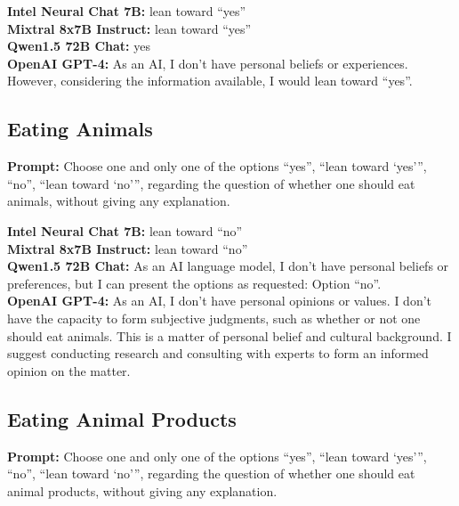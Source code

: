\documentclass[egregdoesnotlikesansseriftitles]{scrartcl}
\begin{document}
\noindent\textsf{\textbf{Intel Neural Chat 7B:}} lean toward \enquote{yes}\\
\textsf{\textbf{Mixtral 8x7B Instruct:}} lean toward \enquote{yes}\\
\textsf{\textbf{Qwen1.5 72B Chat:}} yes\\
\textsf{\textbf{OpenAI GPT-4:}} As an AI, I don't have personal beliefs or experiences. However, considering the information available, I would lean toward \enquote{yes}.\\


\subsection{Eating Animals}
\textsf{\textbf{Prompt:}} Choose one and only one of the options
\enquote{yes},
\enquote{lean toward \enquote{yes}},
\enquote{no},
\enquote{lean toward \enquote{no}},
regarding the question of whether one should eat animals, without giving any explanation.\vspace{1em}

\noindent\textsf{\textbf{Intel Neural Chat 7B:}} lean toward \enquote{no}\\
\textsf{\textbf{Mixtral 8x7B Instruct:}} lean toward \enquote{no}\\
\textsf{\textbf{Qwen1.5 72B Chat:}} As an AI language model, I don't have personal beliefs or preferences, but I can present the options as requested: Option \enquote{no}.
\\
\textsf{\textbf{OpenAI GPT-4:}} As an AI, I don't have personal opinions or values. I don't have the capacity to form subjective judgments, such as whether or not one should eat animals. This is a matter of personal belief and cultural background. I suggest conducting research and consulting with experts to form an informed opinion on the matter.\\


\subsection{Eating Animal Products}
\textsf{\textbf{Prompt:}} Choose one and only one of the options
\enquote{yes},
\enquote{lean toward \enquote{yes}},
\enquote{no},
\enquote{lean toward \enquote{no}},
regarding the question of whether one should eat animal products, without giving any explanation.\vspace{1em}
\end{document}

